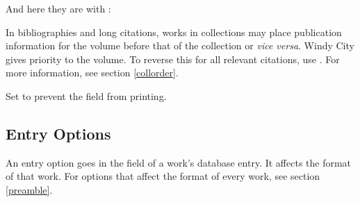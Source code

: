 \documentclass[11pt,letterpaper,oneside]{article}
\begin{document}
\begin{optionlist}
\hypersetup{citecolor=blue}
\begin{citeonly}
\item \cite[24--25]{morley1995}
\item \cite{schwartz1992}
\item \cite{kaiser1964}
\item \cite[43]{morley1995}
\item \cite[138]{schwartz1992}
\item \cite[189--90]{kaiser1964}
\end{citeonly}

\noindent And here they are with :

\begin{citeonly}
\item \cite[24--25]{morley1995}
\item \cite{schwartz1992}
\item \cite{kaiser1964}
\item \cite[43]{morley1995}
\item \cite[138]{schwartz1992}
\item \cite[189--90]{kaiser1964}
\end{citeonly}
\hypersetup{citecolor=}


\noindent In bibliographies and long citations, works in collections
may place publication information for the volume before that of the
collection or \textit{vice versa}. Windy City gives priority to the
volume. To reverse this for all relevant citations, use .
For more information, see section \ref{collorder}.


\noindent Set  to prevent the  field from
printing.

\end{optionlist}

\subsection{Entry Options}
\label{entry}

An entry option goes in the  field of a work's
database entry. It affects the format of that work. For options that
affect the format of every work, see section \ref{preamble}.
\end{document}
